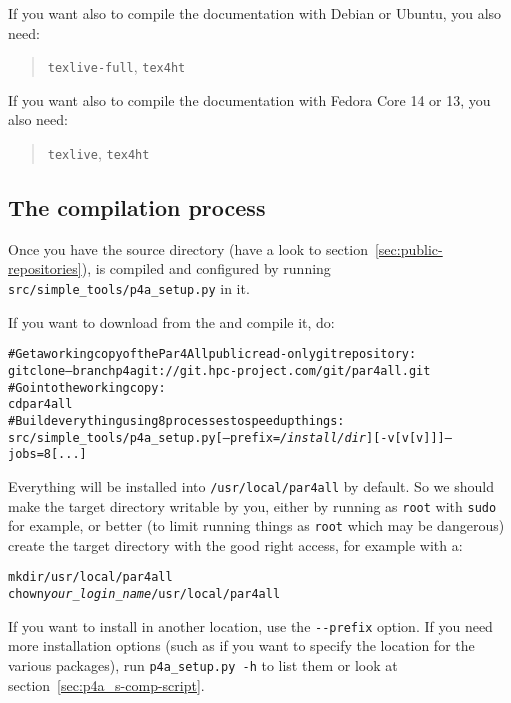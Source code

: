 \documentclass[a4paper]{article}
\begin{document}

If you want also to compile the documentation with Debian or Ubuntu, you 
also need:
\begin{quote}
  \texttt{texlive-full}, \texttt{tex4ht}
\end{quote}

If you want also to compile the documentation with Fedora Core 14 or 13, you 
also need:
\begin{quote}
  \texttt{texlive}, \texttt{tex4ht}
\end{quote}

\subsection{The compilation process}
\label{sec:compilation-process}

Once you have the \Apfa source directory (have a look to
section~\ref{sec:public-repositories}), \Apfa is compiled and configured
by running \verb|src/simple_tools/p4a_setup.py| in it.

If you want to download \Apfa from the \Agit and compile it, do:
\begin{alltt}
# Get a working copy of the Par4All public read-only git repository:
git clone --branch p4a git://git.hpc-project.com/git/par4all.git
# Go into the working copy:
cd par4all
# Build everything using 8 processes to speed up things:
src/simple_tools/p4a_setup.py [--prefix=\emph{/install/dir}] [-v[v[v]]] --jobs=8 [...]
\end{alltt}%
Everything will be installed into \verb|/usr/local/par4all| by default.
So we should make the target directory writable by you, either by running
as \texttt{root} with \texttt{sudo} for example, or better (to limit
running things as \texttt{root} which may be dangerous) create the target
directory with the good right access, for example with a:
\begin{alltt}
mkdir /usr/local/par4all
chown \emph{your_login_name} /usr/local/par4all
\end{alltt}

If you want to install in another location, use the \verb|--prefix|
option.  If you need more installation options (such as if you want to
specify the location for the various packages), run \verb|p4a_setup.py -h| to
list them or look at section~\ref{sec:p4a_s-comp-script}.
\end{document}
